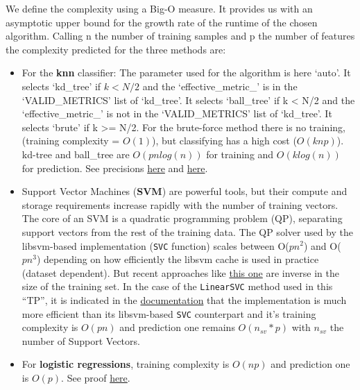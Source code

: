 \documentclass[10pt,a4paper]{article}
\theoremstyle{break}
\begin{document}
We define the complexity using a Big-O measure. It provides us with an asymptotic upper bound for the growth rate of the runtime of the chosen algorithm. Calling n the number of training samples and p the number of features the complexity predicted for the three methods are:

\begin{itemize}
\item
  For the \textbf{knn} classifier: The parameter used for the algorithm is here `auto'. It selects `kd\_tree' if \(k < N/2\) and the `effective\_metric\_' is in the `VALID\_METRICS' list of `kd\_tree'. It selects `ball\_tree' if k \textless{} N/2 and the `effective\_metric\_' is not in the `VALID\_METRICS' list of `kd\_tree'. It selects `brute' if k \textgreater{}= N/2. For the brute-force method there is no training, (training complexity = \(O(1)\)), but classifying has a high cost (\(O(knp)\)). kd-tree and ball\_tree are \(O(pnlog(n))\) for training and \(O(klog(n))\) for prediction.
  See precisions \href{https://towardsdatascience.com/k-nearest-neighbors-computational-complexity-502d2c440d5}{here} and \href{https://scikit-learn.org/stable/modules/generated/sklearn.neighbors.KNeighborsClassifier.html}{here}.
\item
  Support Vector Machines (\textbf{SVM}) are powerful tools, but their compute and storage requirements increase rapidly with the number of training vectors. The core of an SVM is a quadratic programming problem (QP), separating support vectors from the rest of the training data. The QP solver used by the libsvm-based implementation (\texttt{SVC} function) scales between O(\(pn^2\)) and O(\(pn^3\)) depending on how efficiently the libsvm cache is used in practice (dataset dependent). But recent approaches like \href{https://www.cs.huji.ac.il/~shais/papers/SSSICML08.pdf}{this one} are inverse in the size of the training set. In the case of the \texttt{LinearSVC} method used in this ``TP'', it is indicated in the \href{https://scikit-learn.org/stable/modules/svm.html\#complexity}{documentation} that the implementation is much more efficient than its libsvm-based \texttt{SVC} counterpart and it's training complexity is \(O(pn)\) and prediction one remains \(O(n_{sv}*p)\) with \(n_{sv}\) the number of Support Vectors.
\item
  For \textbf{logistic regressions}, training complexity is \(O(np)\) and prediction one is \(O(p)\). See proof \href{https://levelup.gitconnected.com/train-test-complexity-and-space-complexity-of-logistic-regression-2cb3de762054}{here}.
\end{itemize}
\end{document}

